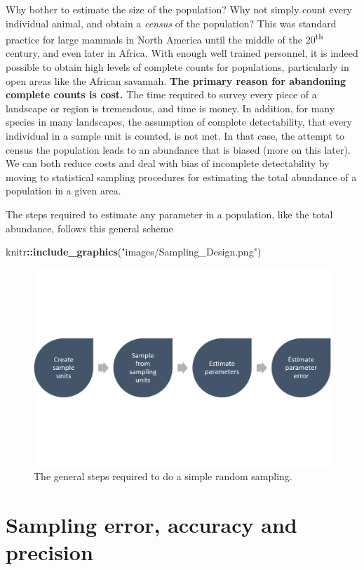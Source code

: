 \documentclass[]{book}
\newenvironment{Shaded}{\begin{snugshade}}{\end{snugshade}}
\newcommand{\KeywordTok}[1]{\textcolor[rgb]{0.13,0.29,0.53}{\textbf{#1}}}
\newcommand{\NormalTok}[1]{#1}
\newcommand{\OperatorTok}[1]{\textcolor[rgb]{0.81,0.36,0.00}{\textbf{#1}}}
\newcommand{\StringTok}[1]{\textcolor[rgb]{0.31,0.60,0.02}{#1}}
\theoremstyle{definition}
\theoremstyle{definition}
\theoremstyle{definition}
\theoremstyle{remark}
\begin{document}
Why bother to estimate the size of the population? Why not simply count
every individual animal, and obtain a \emph{census} of the population?
This was standard practice for large mammals in North America until the
middle of the 20\textsuperscript{th} century, and even later in Africa.
With enough well trained personnel, it is indeed possible to obtain high
levels of complete counts for populations, particularly in open areas
like the African savannah. \textbf{The primary reason for abandoning
complete counts is cost.} The time required to survey every piece of a
landscape or region is tremendous, and time is money. In addition, for
many species in many landscapes, the assumption of complete
detectability, that every individual in a sample unit is counted, is not
met. In that case, the attempt to census the population leads to an
abundance that is biased (more on this later). We can both reduce costs
and deal with bias of incomplete detectability by moving to statistical
sampling procedures for estimating the total abundance of a population
in a given area.

The steps required to estimate any parameter in a population, like the
total abundance, follows this general scheme

\begin{Shaded}
\begin{Highlighting}[]
\NormalTok{knitr}\OperatorTok{::}\KeywordTok{include_graphics}\NormalTok{(}\StringTok{"images/Sampling_Design.png"}\NormalTok{)}
\end{Highlighting}
\end{Shaded}

\begin{figure}
\includegraphics[width=0.49\linewidth]{images/Sampling_Design} \caption{The general steps required to do a simple random sampling.}\label{fig:scheme}
\end{figure}

\hypertarget{sampling-error-accuracy-and-precision}{%
\section{Sampling error, accuracy and
precision}\label{sampling-error-accuracy-and-precision}}
\end{document}
